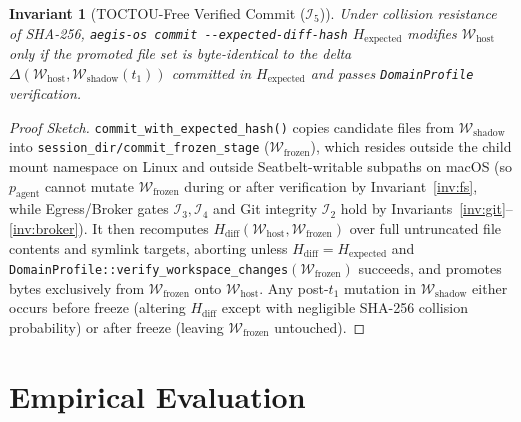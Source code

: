 \documentclass[10pt,twocolumn]{article}
\newtheorem{invariant}{Invariant}
\begin{document}
\begin{invariant}[TOCTOU-Free Verified Commit ($\mathcal{I}_5$)]
\label{inv:toctou}
Under collision resistance of SHA-256, {\normalfont\texttt{aegis-os commit -\/-expected-diff-hash}} $H_{\text{expected}}$ modifies $\mathcal{W}_{\text{host}}$ only if the promoted file set is byte-identical to the delta $\Delta(\mathcal{W}_{\text{host}}, \mathcal{W}_{\text{shadow}}(t_1))$ committed in $H_{\text{expected}}$ and passes \texttt{DomainProfile} verification.
\end{invariant}
\begin{proof}[Proof Sketch]
\texttt{commit\_with\_expected\_hash()} copies candidate files from $\mathcal{W}_{\text{shadow}}$ into \texttt{session\_dir/commit\_frozen\_stage} ($\mathcal{W}_{\text{frozen}}$), which resides outside the child mount namespace on Linux and outside Seatbelt-writable subpaths on macOS (so $p_{\text{agent}}$ cannot mutate $\mathcal{W}_{\text{frozen}}$ during or after verification by Invariant~\ref{inv:fs}, while Egress/Broker gates $\mathcal{I}_3, \mathcal{I}_4$ and Git integrity $\mathcal{I}_2$ hold by Invariants~\ref{inv:git}--\ref{inv:broker}). It then recomputes $H_{\text{diff}}(\mathcal{W}_{\text{host}}, \mathcal{W}_{\text{frozen}})$ over full untruncated file contents and symlink targets, aborting unless $H_{\text{diff}} = H_{\text{expected}}$ and \texttt{DomainProfile::verify\_workspace\_changes}$(\mathcal{W}_{\text{frozen}})$ succeeds, and promotes bytes exclusively from $\mathcal{W}_{\text{frozen}}$ onto $\mathcal{W}_{\text{host}}$. Any post-$t_1$ mutation in $\mathcal{W}_{\text{shadow}}$ either occurs before freeze (altering $H_{\text{diff}}$ except with negligible SHA-256 collision probability) or after freeze (leaving $\mathcal{W}_{\text{frozen}}$ untouched).
\end{proof}

\section{Empirical Evaluation}
\label{sec:eval}
\end{document}
